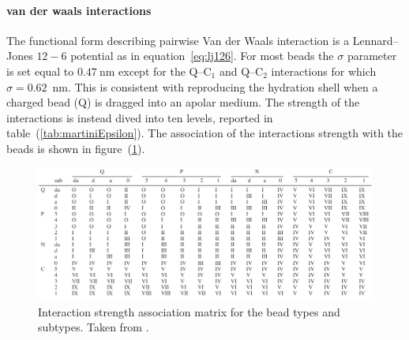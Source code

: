 \paragraph{\textbf{van der waals interactions}} The functional form describing pairwise Van der Waals interaction is a Lennard--Jones $12-6$ potential as in equation~\eqref{eq:lj126}.
For most beads the $\sigma$ parameter is set equal to $0.47~$nm except for the Q--C$_1$ and Q--C$_2$ interactions for which $\sigma = 0.62$~nm. This is consistent with reproducing the hydration shell when a charged bead (Q) is dragged into an apolar medium. The strength of the interactions is instead dived into ten levels, reported in table~(\ref{tab:martiniEpsilon}). The association of the interactions strength with the \martini beads is shown in figure~(\ref{fig:martiniInteractions}).
\begin{figure}[h!t]%
	\center
	\includegraphics[width=\textwidth]{img/martiniInteractions.pdf}%
	\caption{Interaction strength association matrix for the \martini bead types and subtypes. Taken from \cite{Martini}.}
	\label{fig:martiniInteractions}
\end{figure}



